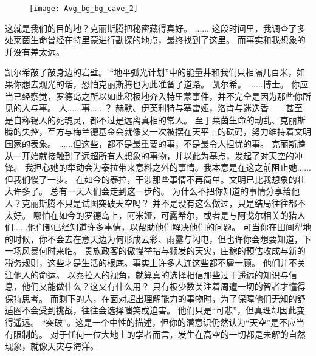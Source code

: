 \documentclass[openany]{book}
\begin{document}
\begin{figure}[h]
    \centering
    \texttt{[image: Avg\_bg\_bg\_cave\_2]}
\end{figure}
\begin{dialogue}
     这就是我们的目的地？克丽斯腾把秘密藏得真好。
     ......
     这段时间里，我调查了多处莱茵生命曾经在特里蒙进行勘探的地点，最终找到了这里。
     而事实和我想象的并没有差太远。\par
    凯尔希敲了敲身边的岩壁。
     “地平弧光计划”中的能量井和我们只相隔几百米，如果你想去观光的话，恐怕克丽斯腾也为此准备了道路。
     凯尔希。
     ......博士。
     你应当已经察觉，罗德岛之所以如此积极地介入特里蒙事件，并不完全是因为那些你所见的人与事。
     人......事......？
     赫默、伊芙利特与塞雷娅，洛肯与迷迭香——甚至是自称锡人的死魂灵，都不过是远离真相的常人。
     至于莱茵生命的动乱、克丽斯腾的失控，军方与梅兰德基金会就像又一次被摆在天平上的砝码，努力维持着文明国家的表象。
     ......但这些，都不是最重要的事，不是最令人担忧的事。
     克丽斯腾从一开始就接触到了远超所有人想象的事物，并以此为基点，发起了对天空的冲锋。
     我担心她的举动会为泰拉带来意料之外的事情。我本意是在这之前阻止她......但我们慢了一步。
     在如今的泰拉，干涉那些事情不再简单。文明已比我想象的壮大许多了。
     总有一天人们会走到这一步的。
     为什么不把你知道的事情分享给他人？克丽斯腾不只是试图突破天空吗？
     并不是没有这么做过，只是结局往往都不太好。
     哪怕在如今的罗德岛上，阿米娅，可露希尔，或者是与阿戈尔相关的猎人们......他们都已经知道许多事情，以帮助他们解决他们的问题。
     可当你在田间犁地的时候，你不会去在意天边为何形成云彩、雨露与闪电，但也许你会想要知道，下一场风暴何时来临。
     贵族政客的傲慢举措与频发的天灾，庄稼的预估收成与新的税务规则，这些才是生活的根底。事实上许多人连这些都不屑一顾。
     他们并不关注他人的命运。
     以泰拉人的视角，就算真的选择相信那些过于遥远的知识与信息，他们又能做什么？这又有什么用？
     只有极少数关注着周遭一切的智者才懂得保持思考。
     而剩下的人，在面对超出理解能力的事物时，为了保障他们无知的舒适圈不会受到挑战，往往会选择嗤笑或迫害。
     他们只是“可悲”，但真理却因此变得遥远。
     “突破”。这是一个中性的描述，但你的潜意识仍然认为“天空”是不应当有限制的。
     对于任何一位大地上的学者而言，发生在高空的一切都是未解的自然现象，就像天灾与海洋。

\end{dialogue}
\end{document}
